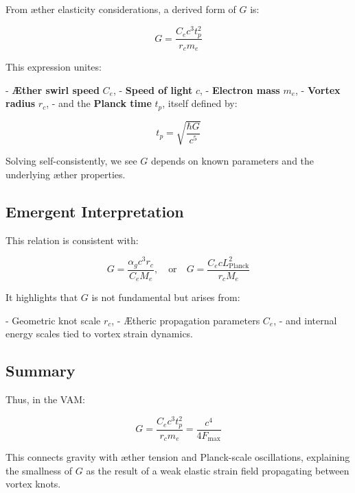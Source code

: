 From æther elasticity considerations, a derived form of \( G \) is:

\begin{equation}
    G = \frac{C_e c^3 t_p^2}{r_c m_e}
\end{equation}

This expression unites:

- \textbf{Æther swirl speed} \( C_e \),
- \textbf{Speed of light} \( c \),
- \textbf{Electron mass} \( m_e \),
- \textbf{Vortex radius} \( r_c \),
- and the \textbf{Planck time} \( t_p \), itself defined by:

\[
    t_p = \sqrt{\frac{\hbar G}{c^5}}
\]

Solving self-consistently, we see \( G \) depends on known parameters and the underlying æther properties.

\subsection*{Emergent Interpretation}

This relation is consistent with:

\[
    G = \frac{\alpha_g c^3 r_c}{C_e M_e}, \quad \text{or} \quad G = \frac{C_e c L_{\text{Planck}}^2}{r_c M_e}
\]

It highlights that \( G \) is not fundamental but arises from:

- Geometric knot scale \( r_c \),
- Ætheric propagation parameters \( C_e \),
- and internal energy scales tied to vortex strain dynamics.

\subsection*{Summary}

Thus, in the VAM:

\begin{equation}
    \boxed{G = \frac{C_e c^3 t_p^2}{r_c m_e} = \frac{c^4}{4 F_{\text{max}}}}
\end{equation}

This connects gravity with æther tension and Planck-scale oscillations, explaining the smallness of \( G \) as the result of a weak elastic strain field propagating between vortex knots.

